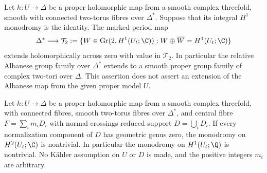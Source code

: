 
\begin{proposition}\hypertarget{tag-01GD}{}\label{cdp:st:D.2.6}



Let $h:U\to\Delta$ be a proper holomorphic map from a smooth
complex threefold, smooth with connected two-torus fibres over
$\Delta^*$. Suppose that its integral $H^1$ monodromy is the
identity. The marked period map
\[
 \Delta^*\longrightarrow
 \mathcal T_2
 :=\{W\in\operatorname{Gr}(2,H^1(U_t;\C)):
                   W\oplus\overline W=H^1(U_t;\C)\}
\]
extends holomorphically across zero with value in $\mathcal T_2$.
In particular the relative Albanese group family over $\Delta^*$
extends to a smooth proper group family of complex two-tori over
$\Delta$. This assertion does not assert an extension of the
Albanese map from the given proper model $U$.
\end{proposition}

\begin{proposition}\hypertarget{tag-01GA}{}\label{cdp:st:D.2.3}



Let $h:U\to\Delta$ be a proper holomorphic map from a smooth
complex threefold, with connected fibres, smooth two-torus fibres
over $\Delta^*$, and central fibre $F=\sum_i m_iD_i$ with
normal-crossings reduced support $D=\bigcup_iD_i$.
If every normalization component of $D$ has geometric genus zero,
the monodromy on $H^2(U_t;\C)$ is nontrivial. In particular the
monodromy on $H^1(U_t;\Q)$ is nontrivial. No K\"ahler assumption
on $U$ or $D$ is made, and the positive integers $m_i$ are arbitrary.
\end{proposition}

